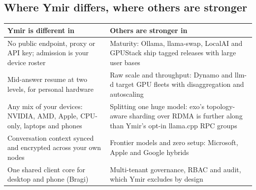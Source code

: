 \subsection{Where Ymir differs, where others are stronger}\label{sec:cmp-verdict}

\begin{xltabular}{\linewidth}{@{}YY@{}}
\toprule
Ymir is different in & Others are stronger in \\
\midrule
\endhead
No public endpoint, proxy or API key; admission is your device roster & Maturity: Ollama, llama-swap, LocalAI and GPUStack ship tagged releases with large user bases \\
Mid-answer resume at two levels, for personal hardware & Raw scale and throughput: Dynamo and llm-d target GPU fleets with disaggregation and autoscaling \\
Any mix of your devices: NVIDIA, AMD, Apple, CPU-only, laptops and phones & Splitting one huge model: exo's topology-aware sharding over RDMA is further along than Ymir's opt-in llama.cpp RPC groups \\
Conversation context synced and encrypted across your own nodes & Frontier models and zero setup: Microsoft, Apple and Google hybrids \\
One shared client core for desktop and phone (Bragi) & Multi-tenant governance, RBAC and audit, which Ymir excludes by design \\
\bottomrule
\end{xltabular}
